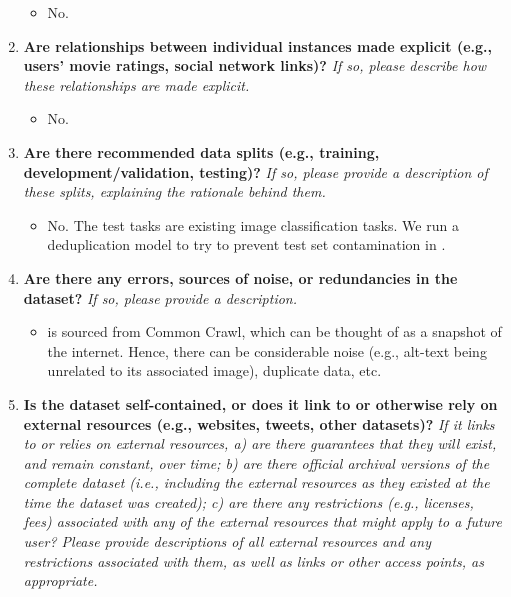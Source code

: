 \begin{enumerate}[label=Q\arabic*]
\begin{itemize}
\item No.
\end{itemize}

\item \textbf{Are relationships between individual instances made explicit (e.g., users' movie ratings, social network links)?} \textit{If so, please describe how these relationships are made explicit.}

\begin{itemize}
\item No.
\end{itemize}

\item \textbf{Are there recommended data splits (e.g., training, development/validation, testing)?} \textit{If so, please provide a description of these splits, explaining the rationale behind them.}

\begin{itemize}
\item No. The test tasks are existing image classification tasks. We run a deduplication model to try to prevent test set contamination in \pool.
\end{itemize}

\item \textbf{Are there any errors, sources of noise, or redundancies in the dataset?} \textit{If so, please provide a description.}

\begin{itemize}
\item \pool is sourced from Common Crawl, which can be thought of as a snapshot of the internet. Hence, there can be considerable noise (e.g., alt-text being unrelated to its associated image), duplicate data, etc.
\end{itemize}

\item \textbf{Is the dataset self-contained, or does it link to or otherwise rely on external resources (e.g., websites, tweets, other datasets)?} \textit{If it links to or relies on external resources, a) are there guarantees that they will exist, and remain constant, over time; b) are there official archival versions of the complete dataset (i.e., including the external resources as they existed at the time the dataset was created); c) are there any restrictions (e.g., licenses, fees) associated with any of the external resources that might apply to a future user? Please provide descriptions of all external resources and any restrictions associated with them, as well as links or other access points, as appropriate.}


\end{enumerate}

